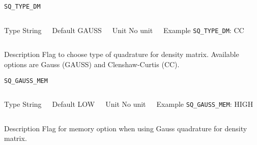 \begin{frame}[allowframebreaks]{\texttt{SQ\_TYPE\_DM}} \label{SQ_TYPE_DM}
\vspace*{-12pt}
\begin{columns}
\begin{block}{Type}
String
\end{block}

\begin{block}{Default}
GAUSS
\end{block}

\begin{block}{Unit}
No unit
\end{block}

\begin{block}{Example}
\texttt{SQ\_TYPE\_DM}: CC
\end{block}
\end{columns}

\begin{block}{Description}
Flag to choose type of quadrature for density matrix. Available options are Gauss (GAUSS) and Clenshaw-Curtis (CC). 
\end{block}

\end{frame}


\begin{frame}[allowframebreaks]{\texttt{SQ\_GAUSS\_MEM}} \label{SQ_GAUSS_MEM}
\vspace*{-12pt}
\begin{columns}
\begin{block}{Type}
String
\end{block}

\begin{block}{Default}
LOW
\end{block}

\begin{block}{Unit}
No unit
\end{block}

\begin{block}{Example}
\texttt{SQ\_GAUSS\_MEM}: HIGH
\end{block}
\end{columns}

\begin{block}{Description}
Flag for memory option when using Gauss quadrature for density matrix. 
\end{block}

\end{frame}



